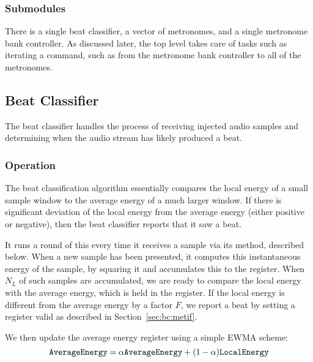 \documentclass[letterpaper]{article}
\begin{document}
        \subsubsection{Submodules}

        There is a single beat classifier, a vector of metronomes, and a single
        metronome bank controller.  As discussed later, the top level takes care of
        tasks such as iterating a command, such as  from the
        metronome bank controller to all of the metronomes.


    \subsection{Beat Classifier}

        The beat classifier handles the process of receiving injected audio samples
        and determining when the audio stream has likely produced a beat.


        \subsubsection{Operation}
            
        The beat classification algorithm essentially compares the local energy of
        a small sample window to the average energy of a much larger window.  If
        there is significant deviation of the local energy from the average energy
        (either positive or negative), then the beat classifier reports that it saw
        a beat.

        It runs a round of this every time it receives a sample via its
         method, described below.  When a new sample has been
        presented, it computes this instantaneous energy of the sample, by squaring
        it and accumulates this to the  register.  When $N_L$ of
        such samples are accumulated, we are ready to compare the local energy with
        the average energy, which is held in the  register.  If
        the local energy is different from the average energy by a factor $F$, we
        report a beat by setting a  register valid as described in
        Section~\ref{sec:bc:metif}.

        We then update the average energy register using a simple EWMA scheme:
        \begin{equation}
            \textrm{\texttt{AverageEnergy}} = \alpha \textrm{\texttt{AverageEnergy}} +
                            (1-\alpha) \textrm{\texttt{LocalEnergy}}
        \end{equation}
\end{document}
